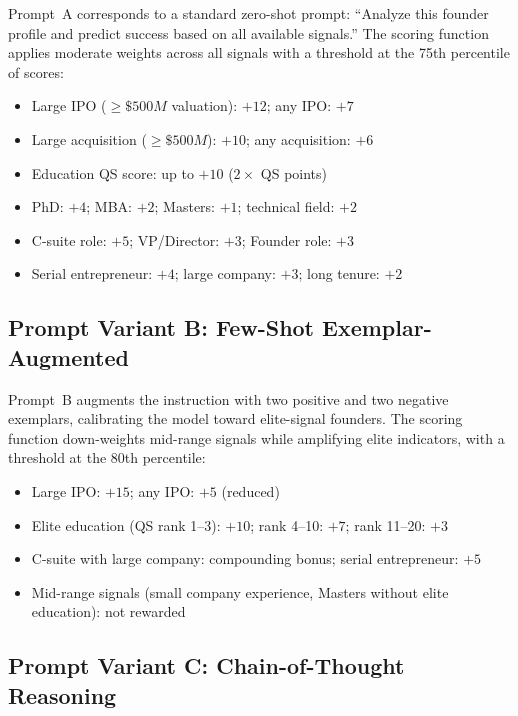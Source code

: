 \documentclass{article}
\begin{document}
Prompt~A corresponds to a standard zero-shot prompt: ``Analyze this founder profile and predict success based on all available signals.'' The scoring function applies moderate weights across all signals with a threshold at the 75th percentile of scores:
\begin{itemize}
  \item Large IPO ($\geq\$500M$ valuation): $+12$; any IPO: $+7$
  \item Large acquisition ($\geq\$500M$): $+10$; any acquisition: $+6$
  \item Education QS score: up to $+10$ ($2 \times$ QS points)
  \item PhD: $+4$; MBA: $+2$; Masters: $+1$; technical field: $+2$
  \item C-suite role: $+5$; VP/Director: $+3$; Founder role: $+3$
  \item Serial entrepreneur: $+4$; large company: $+3$; long tenure: $+2$
\end{itemize}

\subsection{Prompt Variant B: Few-Shot Exemplar-Augmented}

Prompt~B augments the instruction with two positive and two negative exemplars, calibrating the model toward elite-signal founders. The scoring function down-weights mid-range signals while amplifying elite indicators, with a threshold at the 80th percentile:
\begin{itemize}
  \item Large IPO: $+15$; any IPO: $+5$ (reduced)
  \item Elite education (QS rank 1--3): $+10$; rank 4--10: $+7$; rank 11--20: $+3$
  \item C-suite with large company: compounding bonus; serial entrepreneur: $+5$
  \item Mid-range signals (small company experience, Masters without elite education): not rewarded
\end{itemize}

\subsection{Prompt Variant C: Chain-of-Thought Reasoning}
\end{document}
